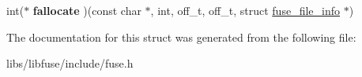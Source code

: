\begin{DoxyCompactItemize}
\item 
int($\ast$ {\bfseries fallocate} )(const char $\ast$, int, off\+\_\+t, off\+\_\+t, struct \hyperlink{structfuse__file__info}{fuse\+\_\+file\+\_\+info} $\ast$)\hypertarget{structfuse__operations_a22ee7ba94cbc9ad068b15a0b1d22afd3}{}\label{structfuse__operations_a22ee7ba94cbc9ad068b15a0b1d22afd3}

\end{DoxyCompactItemize}


The documentation for this struct was generated from the following file\+:\begin{DoxyCompactItemize}
\item 
libs/libfuse/include/fuse.\+h\end{DoxyCompactItemize}
